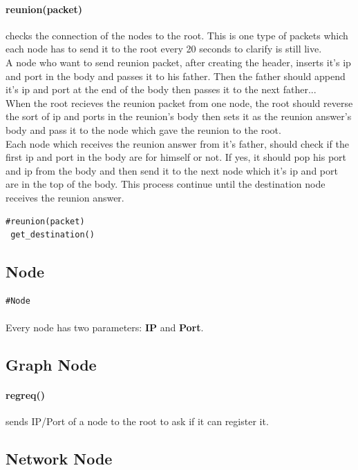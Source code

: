 \documentclass{article}
\begin{document}
\paragraph{reunion(packet)} checks the connection of the nodes to the root. This is one type of packets which each node has to send it to the root every 20 seconds to clarify is still live. \\
A node who want to send reunion packet, after creating the header, inserts it's ip and port in the body and passes it to his father. Then the father should append it's ip and port at the end of the body then passes it to the next father... \\
When the root recieves the reunion packet from one node, the root should reverse the sort of ip and ports in the reunion's body then sets it as the reunion answer's body and pass it to the node which gave the reunion to the root. \\
Each node which receives the reunion answer from it's father, should check if the first ip and port in the body are for himself or not. If yes, it should pop his port and ip from the body and then send it to the next node which it's ip and port are in the top of the body.
This process continue until the destination node receives the reunion answer.
\begin{lstlisting}
#reunion(packet)
 get_destination()
\end{lstlisting}
\subsection{Node}
\begin{lstlisting}
#Node

\end{lstlisting}
\paragraph{}Every node has two parameters: \textbf{IP} and \textbf{Port}.
\subsection{Graph Node}
\paragraph{reg\underline{\hspace{.05in}}req()} sends IP/Port of a node to the root to ask if it can register it. 
\subsection{Network Node}
\end{document}
